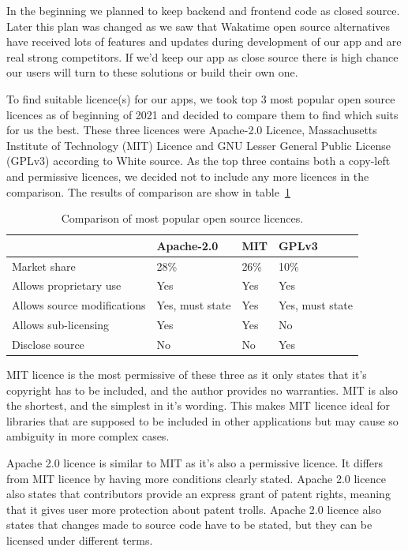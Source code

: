 In the beginning we planned to keep backend and frontend code as closed source.
Later this plan was changed as we saw that Wakatime open source alternatives have received lots of features and updates
during development of our app and are real strong competitors.
If we'd keep our app as close source there is high chance our users will turn to these solutions or build their own one.

To find suitable licence(s) for our apps, we took top 3 most popular open source licences as of beginning of 2021 and decided
to compare them to find which suits for us the best.
These three licences were Apache-2.0 Licence, Massachusetts Institute of Technology (MIT) Licence and GNU Lesser General Public License (GPLv3) according to White source.
As the top three contains both a copy-left and permissive licences, we decided not to include any more licences in the comparison.
\cite{open-source-licences}
The results of comparison are show in table~\ref{tab:open-source-licence-comparison}
\begin{table}[H]
    \centering
    \begin{tabular}{ | p{4cm} | p{2cm} | p{2cm} | p{2cm} |}
        \hline
         & \textbf{Apache-2.0} & \textbf{MIT} & \textbf{GPLv3}\\
        \hline
        Market share & 28\% & 26\% & 10\% \\
        \hline
        Allows proprietary use & Yes & Yes & Yes\\
        \hline
        Allows source modifications & Yes, must state & Yes & Yes, must state\\
        \hline
        Allows sub-licensing & Yes & Yes & No\\
        \hline
        Disclose source & No & No & Yes\\
        \hline
    \end{tabular}
    \caption{Comparison of most popular open source licences.}
    \label{tab:open-source-licence-comparison}
\end{table}

MIT licence is the most permissive of these three as it only states that it's copyright has to be included, and
the author provides no warranties.
MIT is also the shortest, and the simplest in it's wording.
This makes MIT licence ideal for libraries that are supposed to be included in other applications but may cause
so ambiguity in more complex cases.
\cite{mit-licences}

Apache 2.0 licence is similar to MIT as it's also a permissive licence.
It differs from MIT licence by having more conditions clearly stated.
Apache 2.0 licence also states that contributors provide an express grant of patent rights, meaning that it gives
user more protection about patent trolls.
Apache 2.0 licence also states that changes made to source code have to be stated, but they can be licensed under different terms.
\cite{apache-2-licences}

